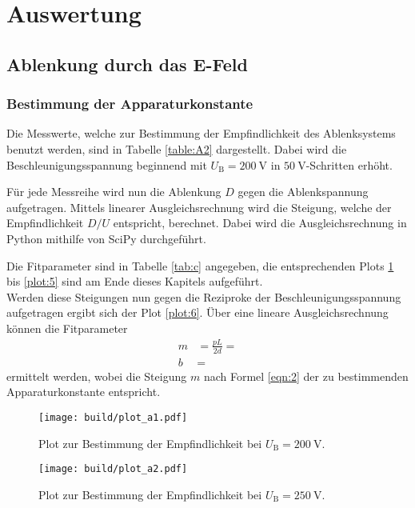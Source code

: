 \section{Auswertung}
\label{sec:Auswertung}


\subsection{Ablenkung durch das E-Feld}

\subsubsection{Bestimmung der Apparaturkonstante}



Die Messwerte, welche zur Bestimmung der Empfindlichkeit des Ablenksystems benutzt werden, sind in Tabelle \ref{table:A2} dargestellt.
Dabei wird die Beschleunigungsspannung beginnend mit $U_{\text{B}} = \SI{200}{\volt}$ in $\SI{50}{\volt}$-Schritten erhöht.

Für jede Messreihe wird nun die Ablenkung $D$ gegen die Ablenkspannung aufgetragen.
Mittels linearer Ausgleichsrechnung wird die Steigung, welche der Empfindlichkeit $D/U$ entspricht, berechnet.
Dabei wird die Ausgleichsrechnung in Python mithilfe von SciPy \cite{scipy} durchgeführt.

Die Fitparameter sind in Tabelle \ref{tab:c} angegeben, die entsprechenden Plots \ref{plot:1} bis \ref{plot:5} sind am Ende dieses Kapitels aufgeführt. \\
Werden diese Steigungen nun gegen die Reziproke der Beschleunigungsspannung aufgetragen ergibt sich der Plot \ref{plot:6}.
Über eine lineare Ausgleichsrechnung können die Fitparameter
\begin{align*}
  m &= \frac{pL}{2d} =  \\
  b &= 
\end{align*}
ermittelt werden, wobei die Steigung $m$ nach Formel \eqref{eqn:2} der zu bestimmenden Apparaturkonstante entspricht.

\begin{figure}
  \centering
  \texttt{[image: build/plot\_a1.pdf]}
  \caption{Plot zur Bestimmung der Empfindlichkeit bei $U_{\text{B}} = \SI{200}{\volt}$.}
  \label{plot:1}
\end{figure}

\begin{figure}
  \centering
  \texttt{[image: build/plot\_a2.pdf]}
  \caption{Plot zur Bestimmung der Empfindlichkeit bei $U_{\text{B}} = \SI{250}{\volt}$.}
  \label{plot:2}
\end{figure}

